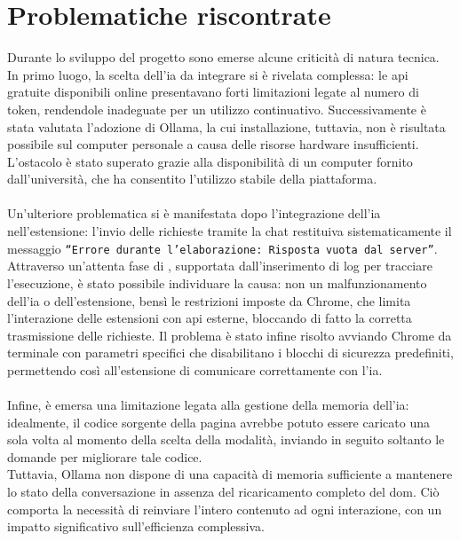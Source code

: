 \section{Problematiche riscontrate}
\noindent Durante lo sviluppo del progetto sono emerse alcune criticità di natura tecnica. In primo luogo, la scelta dell’\acrshort{ia} da integrare si è rivelata complessa: le \acrshort{api} gratuite disponibili online presentavano forti limitazioni legate al numero di token, rendendole inadeguate per un utilizzo continuativo. Successivamente è stata valutata l’adozione di Ollama, la cui installazione, tuttavia, non è risultata possibile sul computer personale a causa delle risorse hardware insufficienti. L’ostacolo è stato superato grazie alla disponibilità di un computer fornito dall’università, che ha consentito l’utilizzo stabile della piattaforma.\\\\
Un’ulteriore problematica si è manifestata dopo l’integrazione dell’\acrshort{ia} nell’estensione: l’invio delle richieste tramite la chat restituiva sistematicamente il messaggio \texttt{“Errore durante l’elaborazione: Risposta vuota dal server”}. Attraverso un’attenta fase di , supportata dall’inserimento di log per tracciare l’esecuzione, è stato possibile individuare la causa: non un malfunzionamento dell’\acrshort{ia} o dell'estensione, bensì le restrizioni imposte da Chrome, che limita l’interazione delle estensioni con \acrshort{api} esterne, bloccando di fatto la corretta trasmissione delle richieste. Il problema è stato infine risolto avviando Chrome da terminale con parametri specifici che disabilitano i blocchi di sicurezza predefiniti, permettendo così all’estensione di comunicare correttamente con l’\acrshort{ia}.\\\\
Infine, è emersa una limitazione legata alla gestione della memoria dell’\acrshort{ia}: idealmente, il codice sorgente della pagina avrebbe potuto essere caricato una sola volta al momento della scelta della modalità, inviando in seguito soltanto le domande per migliorare tale codice. \\Tuttavia, Ollama non dispone di una capacità di memoria sufficiente a mantenere lo stato della conversazione in assenza del ricaricamento completo del \acrshort{dom}. Ciò comporta la necessità di reinviare l’intero contenuto ad ogni interazione, con un impatto significativo sull’efficienza complessiva.
